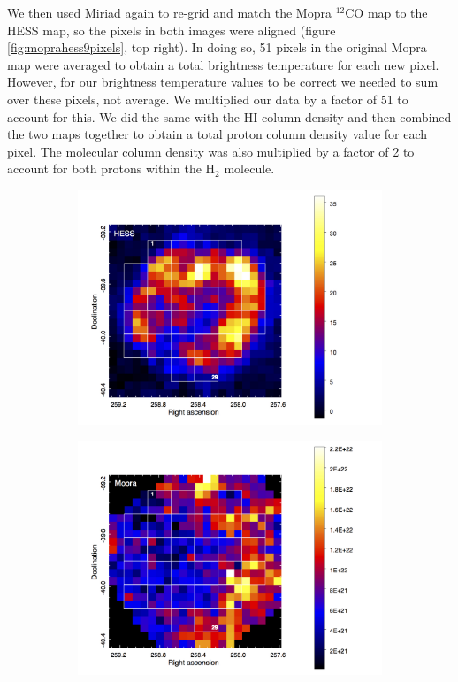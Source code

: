 \documentclass[12pt,a4paper]{article}
\begin{document}
We then used Miriad again to re-grid and match the Mopra $^{12}$CO map to the HESS map, so the pixels in both images were aligned (figure \ref{fig:moprahess9pixels}, top right).
In doing so, 51 pixels in the original Mopra map were averaged to obtain a total brightness temperature for each new pixel. However, for our brightness temperature values to be correct we needed to sum over these pixels, not average. We multiplied our data by a factor of 51 to account for this. We did the same with the HI column density and then combined the two maps together to obtain a total proton column density value for each pixel. The molecular column density was also multiplied by a factor of 2 to account for both protons within the H$_2$ molecule. 
\begin{figure}[H]
	\begin{subfigure}{0.5\textwidth}
		\centering
		\includegraphics[width=1.05\linewidth, height=0.25\textheight]{hess_9pixels}
	\end{subfigure}
	\begin{subfigure}{0.5\textwidth}
		\centering
		\includegraphics[width=1.05\linewidth, height=0.25\textheight]{mopra_9pixels}

\end{subfigure}
\end{figure}
\end{document}
